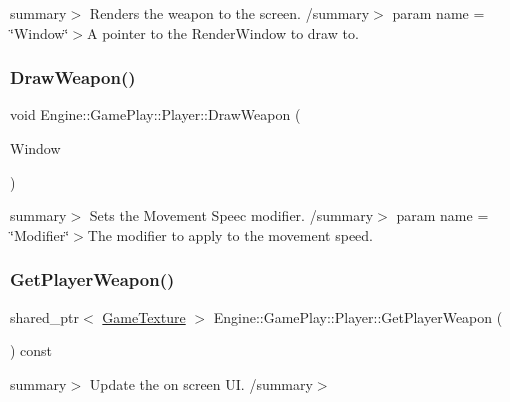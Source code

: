 summary$>$ Renders the weapon to the screen. /summary$>$ param name = \char`\"{}\+Window\char`\"{}$>$A pointer to the Render\+Window to draw to.\mbox{\label{class_engine_1_1_game_play_1_1_player_a3705c78e4c21631432c4c21a0a4e4084}} 
\subsubsection{\texorpdfstring{Draw\+Weapon()}{DrawWeapon()}}
{\footnotesize\ttfamily void Engine\+::\+Game\+Play\+::\+Player\+::\+Draw\+Weapon (\begin{DoxyParamCaption}\item[{Render\+Window $\ast$}]{Window }\end{DoxyParamCaption})}

summary$>$ Sets the Movement Speec modifier. /summary$>$ param name = \char`\"{}\+Modifier\char`\"{}$>$The modifier to apply to the movement speed.\mbox{\label{class_engine_1_1_game_play_1_1_player_a22261e9c06350f20de748418085dd26a}} 
\subsubsection{\texorpdfstring{Get\+Player\+Weapon()}{GetPlayerWeapon()}}
{\footnotesize\ttfamily shared\+\_\+ptr$<$ \hyperlink{class_engine_1_1_core_1_1_game_texture}{Game\+Texture} $>$ Engine\+::\+Game\+Play\+::\+Player\+::\+Get\+Player\+Weapon (\begin{DoxyParamCaption}\item[{void}]{ }\end{DoxyParamCaption}) const}

summary$>$ Update the on screen UI. /summary$>$ \mbox{\label{class_engine_1_1_game_play_1_1_player_aad2c7f9e75ef259e202be0d00924ec1d}} 
